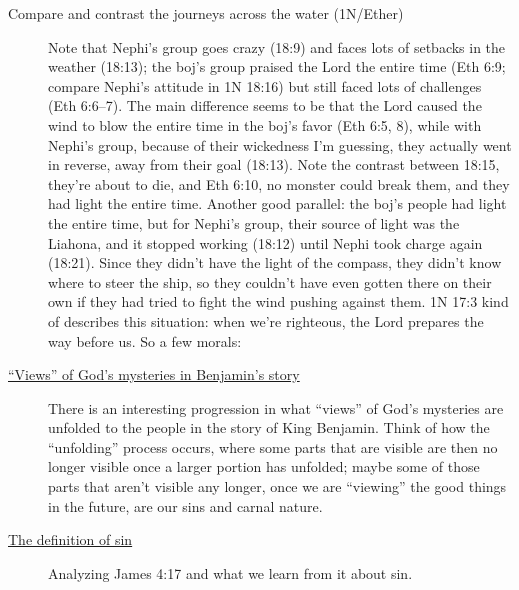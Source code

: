 \begin{description}
		\item[Compare and contrast the journeys across the water (1N/Ether)]
			Note that Nephi's group goes crazy (18:9) and faces lots of setbacks in the weather (18:13); the boj's group praised the Lord the entire time (Eth 6:9; compare Nephi's attitude in 1N 18:16) but still faced lots of challenges (Eth 6:6--7). The main difference seems to be that the Lord caused the wind to blow the entire time in the boj's favor (Eth 6:5, 8), while with Nephi's group, because of their wickedness I'm guessing, they actually went in reverse, away from their goal (18:13). Note the contrast between 18:15, they're about to die, and Eth 6:10, no monster could break them, and they had light the entire time.
			Another good parallel: the boj's people had light the entire time, but for Nephi's group, their source of light was the Liahona, and it stopped working (18:12) until Nephi took charge again (18:21). Since they didn't have the light of the compass, they didn't know where to steer the ship, so they couldn't have even gotten there on their own if they had tried to fight the wind pushing against them.
			1N 17:3 kind of describes this situation: when we're righteous, the Lord prepares the way before us.
			So a few morals:
	
		\item[{\hyperref[MOSIAH-2-9-NOTE-view]{``Views'' of God's mysteries in Benjamin's story}}]
			There is an interesting progression in what ``views'' of God's mysteries are unfolded to the people in the story of King Benjamin. Think of how the ``unfolding'' process occurs, where some parts that are visible are then no longer visible once a larger portion has unfolded; maybe some of those parts that aren't visible any longer, once we are ``viewing'' the good things in the future, are our sins and carnal nature.
			
		\item[{\hyperref[SIN-definition]{The definition of sin}}]
			Analyzing James 4:17 and what we learn from it about sin.
			

\end{description}
